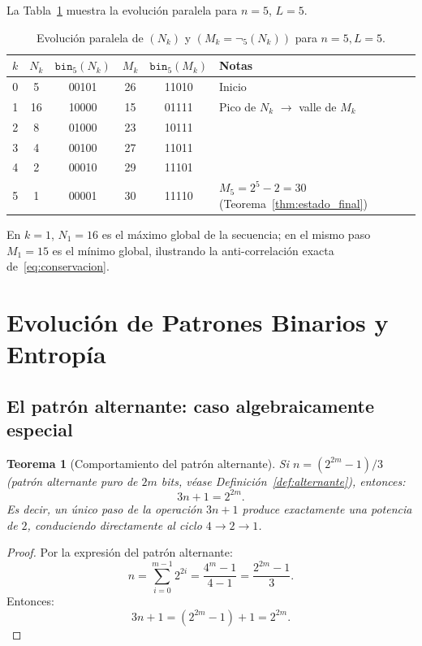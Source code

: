 \documentclass[11pt,a4paper]{article}
\newtheorem{theorem}{Teorema}[section]
\begin{document}
La Tabla~\ref{tab:ejemplo_n5} muestra la evolución paralela para
$n = 5$, $L = 5$.

\begin{table}[h!]
\centering
\caption{Evolución paralela de $(N_k)$ y $(M_k = \neg_5(N_k))$ para $n=5, L=5$.}
\label{tab:ejemplo_n5}
\begin{tabular}{cccccl}
\toprule
$k$ & $N_k$ & $\mathtt{bin}_5(N_k)$ & $M_k$ & $\mathtt{bin}_5(M_k)$ & Notas \\
\midrule
0 & 5  & 00101 & 26 & 11010 & Inicio \\
1 & 16 & 10000 & 15 & 01111 & Pico de $N_k$ $\to$ valle de $M_k$ \\
2 & 8  & 01000 & 23 & 10111 & \\
3 & 4  & 00100 & 27 & 11011 & \\
4 & 2  & 00010 & 29 & 11101 & \\
5 & 1  & 00001 & 30 & 11110 & $M_5 = 2^5-2 = 30$ (Teorema~\ref{thm:estado_final}) \\
\bottomrule
\end{tabular}
\end{table}

En $k=1$, $N_1=16$ es el máximo global de la secuencia; en el mismo paso
$M_1=15$ es el mínimo global, ilustrando la anti-correlación exacta
de~\eqref{eq:conservacion}.

\section{Evolución de Patrones Binarios y Entropía}
\label{sec:patrones}

\subsection{El patrón alternante: caso algebraicamente especial}

\begin{theorem}[Comportamiento del patrón alternante]
\label{thm:alternante}
Si $n = (2^{2m}-1)/3$ (patrón alternante puro de $2m$ bits,
véase Definición~\ref{def:alternante}), entonces:
\[
  3n + 1 = 2^{2m}.
\]
Es decir, un único paso de la operación $3n+1$ produce exactamente
una potencia de $2$, conduciendo directamente al ciclo $4{\to}2{\to}1$.
\end{theorem}

\begin{proof}
Por la expresión del patrón alternante:
\[
  n = \sum_{i=0}^{m-1} 2^{2i} = \frac{4^m - 1}{4 - 1} = \frac{2^{2m}-1}{3}.
\]
Entonces:
\[
  3n + 1 = (2^{2m}-1) + 1 = 2^{2m}.
\]
\end{proof}
\end{document}

